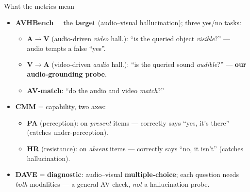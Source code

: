 \documentclass[aspectratio=169,11pt]{beamer}
\begin{document}
\begin{frame}{What the metrics mean}
\begin{itemize}
\item \textbf{AVHBench} = the \textbf{target} (audio--visual hallucination); three yes/no tasks:
\vspace{0.06in}
  \begin{itemize}\footnotesize
  \item \textbf{A$\to$V} (audio-driven \emph{video} hall.): ``is the queried object \emph{visible}?'' --- audio tempts a false ``yes''.
  \item \textbf{V$\to$A} (video-driven \emph{audio} hall.): ``is the queried sound \emph{audible}?'' --- \textbf{our audio-grounding probe}.
  \item \textbf{AV-match}: ``do the audio and video \emph{match}?''
  \end{itemize}
\vspace{0.12in}
\item \textbf{CMM} = capability, two axes:
\vspace{0.06in}
  \begin{itemize}\footnotesize
  \item \textbf{PA} (perception): on \emph{present} items --- correctly says ``yes, it's there'' (catches under-perception).
  \item \textbf{HR} (resistance): on \emph{absent} items --- correctly says ``no, it isn't'' (catches hallucination).
  \end{itemize}
\vspace{0.12in}
\item \textbf{DAVE} = \textbf{diagnostic}: audio--visual \textbf{multiple-choice}; each question needs \emph{both} modalities --- a general AV check, \emph{not} a hallucination probe.
\end{itemize}
\end{frame}
\end{document}

